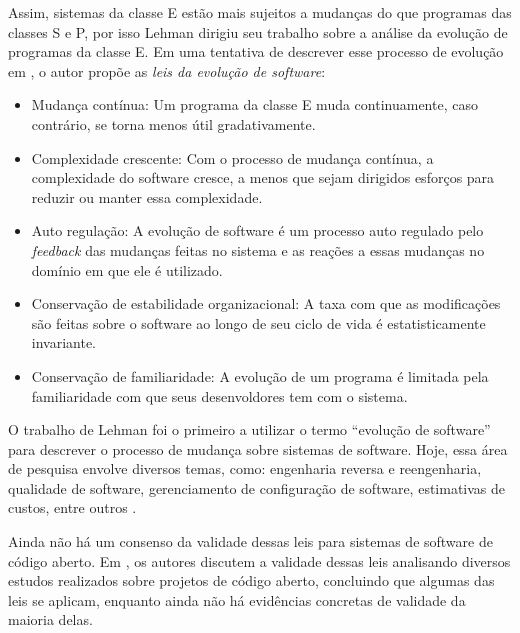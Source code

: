 \documentclass[a4paper, 12pt, twoside]{book}
\begin{document}
        Assim, sistemas da classe E estão mais sujeitos a mudanças do que programas das classes S 
        e P, por isso Lehman dirigiu seu trabalho sobre a análise da evolução de programas da 
        classe E. Em uma tentativa de descrever esse processo de evolução em \cite{Lehman1980b}, o 
        autor propõe as \textit{leis da evolução de software}:
        \begin{itemize}
            \item Mudança contínua: Um programa da classe E muda continuamente, caso contrário, se 
                   torna menos útil gradativamente.
            \item Complexidade crescente: Com o processo de mudança contínua, a complexidade do 
                  software cresce, a menos que sejam dirigidos esforços para reduzir ou manter essa 
                  complexidade.
            \item Auto regulação: A evolução de software é um processo auto regulado pelo \textit{feedback} 
                  das mudanças feitas no sistema e as reações a essas mudanças no domínio em que ele 
                  é utilizado.
            \item Conservação de estabilidade organizacional: A taxa com que as modificações são 
                  feitas sobre o software ao longo de seu ciclo de vida é estatisticamente invariante.
            \item Conservação de familiaridade: A evolução de um programa é limitada pela 
                  familiaridade com que seus desenvoldores tem com o sistema.
        \end{itemize}

        O trabalho de Lehman foi o primeiro a utilizar o termo ``evolução de software'' para
        descrever o processo de mudança sobre sistemas de software. Hoje, essa área de pesquisa
        envolve diversos temas, como: engenharia reversa e reengenharia, qualidade de software,
        gerenciamento de configuração de software, estimativas de custos, entre outros 
        \cite{DBLP:series/springer/Mens08}.
        
        Ainda não há um consenso da validade dessas leis para sistemas de software de código aberto. 
        Em  \cite{DBLP:series/springer/Fernandez-RamilLWC08}, os autores discutem a validade dessas
        leis analisando diversos estudos realizados sobre projetos de código aberto, concluindo que
        algumas das leis se aplicam, enquanto ainda não há evidências concretas de validade da 
        maioria delas.
        
\end{document}
